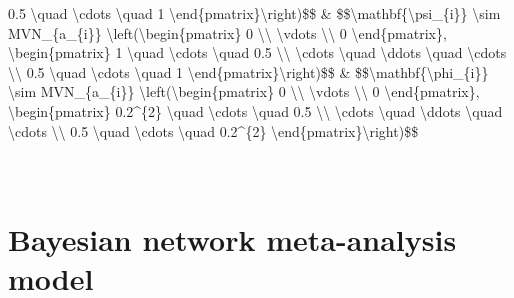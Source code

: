\begin{table}
\begin{tabu}
0.5 \textbackslash{}quad \textbackslash{}cdots \textbackslash{}quad 1
\textbackslash{}end\{pmatrix\}\textbackslash{}right)\$\$ & \$\$\textbackslash{}mathbf\{\textbackslash{}psi\_\{i\}\} \textbackslash{}sim MVN\_\{a\_\{i\}\} \textbackslash{}left(\textbackslash{}begin\{pmatrix\} 
0 \textbackslash{}\textbackslash{}
\textbackslash{}vdots \textbackslash{}\textbackslash{}
0
\textbackslash{}end\{pmatrix\},
\textbackslash{}begin\{pmatrix\}
1 \textbackslash{}quad \textbackslash{}cdots \textbackslash{}quad 0.5 \textbackslash{}\textbackslash{}
\textbackslash{}cdots \textbackslash{}quad \textbackslash{}ddots \textbackslash{}quad \textbackslash{}cdots \textbackslash{}\textbackslash{}
0.5 \textbackslash{}quad \textbackslash{}cdots \textbackslash{}quad 1
\textbackslash{}end\{pmatrix\}\textbackslash{}right)\$\$ & \$\$\textbackslash{}mathbf\{\textbackslash{}phi\_\{i\}\} \textbackslash{}sim MVN\_\{a\_\{i\}\} \textbackslash{}left(\textbackslash{}begin\{pmatrix\} 
0 \textbackslash{}\textbackslash{}
\textbackslash{}vdots \textbackslash{}\textbackslash{}
0
\textbackslash{}end\{pmatrix\},
\textbackslash{}begin\{pmatrix\}
0.2\textasciicircum{}\{2\} \textbackslash{}quad \textbackslash{}cdots \textbackslash{}quad 0.5 \textbackslash{}\textbackslash{}
\textbackslash{}cdots \textbackslash{}quad \textbackslash{}ddots \textbackslash{}quad \textbackslash{}cdots \textbackslash{}\textbackslash{}
0.5 \textbackslash{}quad \textbackslash{}cdots \textbackslash{}quad 0.2\textasciicircum{}\{2\}
\textbackslash{}end\{pmatrix\}\textbackslash{}right)\$\$\\
\hline
{}\\
\\
\end{tabu}
\end{table}

\hypertarget{bayesian-network-meta-analysis-model}{%
\section{Bayesian network meta-analysis model}\label{bayesian-network-meta-analysis-model}}

